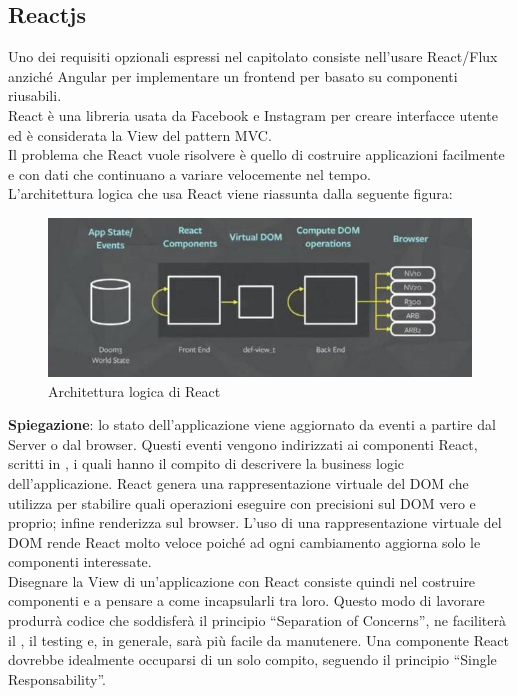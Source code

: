 \subsection{Reactjs}
Uno dei requisiti opzionali espressi nel capitolato consiste nell'usare React/Flux anziché Angular per implementare un frontend per  basato su componenti riusabili.\\
React è una libreria  usata da Facebook e Instagram per creare interfacce utente ed è considerata la View del pattern MVC.\\
Il problema che React vuole risolvere è quello di costruire applicazioni facilmente  e con dati che continuano a variare velocemente nel tempo.\\ 
L'architettura logica che usa React viene riassunta dalla seguente figura:
\begin{figure}[H]
  \centering
  \includegraphics[width=.8\textwidth]{res/sections/imgs/react.png}
  \caption{Architettura logica di React}
  \label{fig:salvataggio}
\end{figure}
\textbf{Spiegazione}: lo stato dell'applicazione viene aggiornato da eventi a partire dal Server o dal browser. Questi eventi vengono indirizzati ai componenti React, scritti in , i quali hanno il compito di descrivere la business logic dell'applicazione. React genera una rappresentazione virtuale del DOM che utilizza per stabilire quali operazioni eseguire con precisioni sul DOM vero e proprio; infine renderizza sul browser. L'uso di una rappresentazione virtuale del DOM rende React molto veloce poiché ad ogni cambiamento aggiorna solo le componenti interessate.\\
Disegnare la View di un'applicazione con React consiste quindi nel costruire componenti e a pensare a come incapsularli tra loro. Questo modo di lavorare produrrà codice che soddisferà il principio ``Separation of Concerns'', ne faciliterà il , il testing e, in generale, sarà più facile da manutenere.
Una componente React dovrebbe idealmente occuparsi di un solo compito, seguendo il principio ``Single Responsability''.\\
